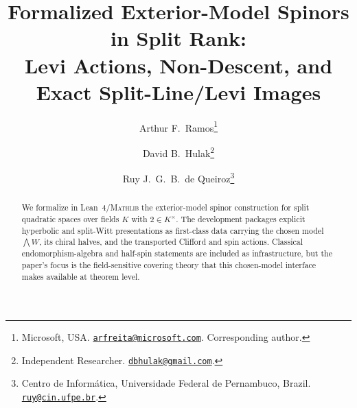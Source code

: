 \documentclass[11pt,a4paper]{article}
\title{Formalized Exterior-Model Spinors in Split Rank:\\
       Levi Actions, Non-Descent, and Exact Split-Line/Levi Images}
\author{%
  Arthur F.~Ramos\thanks{Microsoft, USA.
    \href{mailto:arfreita@microsoft.com}{\nolinkurl{arfreita@microsoft.com}}.
    Corresponding author.}
  \and
  David B.~Hulak\thanks{Independent Researcher.
    \href{mailto:dbhulak@gmail.com}{\nolinkurl{dbhulak@gmail.com}}.}
  \and
  Ruy J.~G.~B.~de Queiroz\thanks{Centro de Inform\'atica,
    Universidade Federal de Pernambuco, Brazil.
    \href{mailto:ruy@cin.ufpe.br}{\nolinkurl{ruy@cin.ufpe.br}}.}%
}
\date{}
\theoremstyle{plain}
\theoremstyle{definition}
\theoremstyle{remark}
\newcommand{\Lean}{Lean~4\xspace}
\newcommand{\Mathlib}{\textsc{Mathlib}\xspace}
\begin{document}
\maketitle

\begin{abstract}
We formalize in \Lean/\Mathlib the exterior-model spinor construction for split
quadratic spaces over fields $K$ with $2\in K^\times$. The development packages
explicit hyperbolic and split-Witt presentations as first-class data carrying
the chosen model $\bigwedge W$, its chiral halves, and the transported Clifford
and spin actions. Classical endomorphism-algebra and half-spin statements are
included as infrastructure, but the paper's focus is the field-sensitive
covering theory that this chosen-model interface makes available at theorem
level.


\end{abstract}
\end{document}
